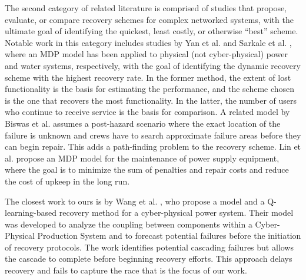 \documentclass[conference]{IEEEtran}
\begin{document}
The second category of related literature is comprised of studies that propose, evaluate, or compare recovery schemes for complex networked systems, with the ultimate goal of identifying the quickest, least costly, or otherwise ``best'' scheme. Notable work in this category includes studies by Yan et al. \cite{yan_dynamic_2021} and Sarkale et al. \cite{sarkale_solving_2018}, where an MDP model has been applied to physical (not cyber-physical) power and water systems, respectively, with the goal of identifying the dynamic recovery scheme with the highest recovery rate.  
In the former method, the extent of lost functionality is the basis for estimating the performance, and the scheme chosen is the one that recovers the most functionality. In the latter, the number of users who continue to receive service is the basis for comparison. A related model by Biswas et al. \cite{biswas_repair_2025} assumes a post-hazard scenario where the exact location of the failure is unknown and crews have to search approximate failure areas before they can begin repair. This adds a path-finding problem to the recovery scheme. Lin et al. \cite{lin_condition-based_2022} propose an  MDP model for the maintenance of power supply equipment, where the goal is to minimize the sum of penalties and repair costs and reduce the cost of upkeep in the long run.

The closest work to ours is by Wang et al. \cite{wang_q-learning-based_2025}, who propose a model and a Q-learning-based recovery method for a cyber-physical power system. Their model was developed to analyze the coupling between components within a Cyber-Physical Production System and to forecast potential failures before the initiation of recovery protocols. The work identifies potential cascading failures but allows the cascade to complete before beginning recovery efforts. This approach delays recovery and fails to capture the race that is the focus of our work. 
\end{document}
